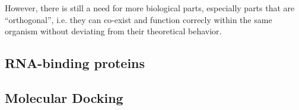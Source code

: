 However, there is still a need for more biological parts, especially parts that are ``orthogonal'', i.e. they can co-exist and function correcly within the same organism without deviating from their theoretical behavior. 

\subsection{RNA-binding proteins}

\subsection{Molecular Docking}